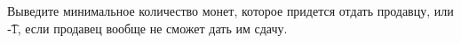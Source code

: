 Выведите минимальное количество монет, которое придется отдать продавцу,
или \t{-1}, если продавец вообще не сможет дать им сдачу.